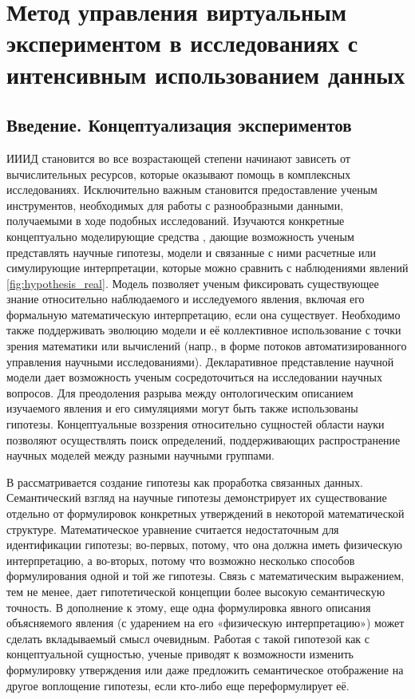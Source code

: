 \chapter{Метод управления виртуальным экспериментом в исследованиях с интенсивным использованием данных} \label{chapt2}
\newtheorem{mydef}{Definition}

\section{Введение. Концептуализация экспериментов}\label{sect1_2_6}

ИИИД становится во все возрастающей степени начинают зависеть от вычислительных ресурсов, которые оказывают помощь в 
комплексных исследованиях. Исключительно важным становится предоставление ученым инструментов, необходимых для работы 
с разнообразными данными, получаемыми в ходе подобных исследований. Изучаются конкретные концептуально моделирующие 
средства \cite{porto2013}, дающие возможность ученым представлять научные гипотезы, модели и связанные с ними расчетные 
или симулирующие интерпретации, которые можно сравнить с наблюдениями явлений \cref{fig:hypothesis_real}. Модель 
позволяет ученым фиксировать существующее знание относительно наблюдаемого и исследуемого явления, включая его 
формальную математическую интерпретацию, если она существует. Необходимо также поддерживать эволюцию модели и её 
коллективное использование с точки зрения математики или вычислений (напр., в форме потоков автоматизированного 
управления научными исследованиями). Декларативное представление научной модели дает возможность ученым сосредоточиться 
на исследовании научных вопросов. Для преодоления разрыва между онтологическим описанием изучаемого явления и его 
симуляциями могут быть также использованы гипотезы. Концептуальные воззрения относительно сущностей области науки 
позволяют осуществлять поиск определений, поддерживающих распространение научных моделей между разными 
научными группами. 

В \cite{Goncalves2013} рассматривается создание гипотезы как проработка связанных данных. Семантический взгляд на 
научные гипотезы демонстрирует их существование отдельно от формулировок конкретных утверждений в некоторой 
математической структуре. Математическое уравнение считается недостаточным для идентификации гипотезы; во-первых, 
потому, что она должна иметь физическую интерпретацию, а во-вторых, потому что возможно несколько способов 
формулирования одной и той же гипотезы. Связь с математическим выражением, тем не менее, дает гипотетической 
концепции более высокую семантическую точность. В дополнение к этому, еще одна формулировка явного описания 
объясняемого явления (с ударением на его «физическую интерпретацию») может сделать вкладываемый смысл очевидным. 
Работая с такой гипотезой как с концептуальной сущностью, ученые приводят к возможности изменить формулировку 
утверждения или даже предложить семантическое отображение на другое воплощение гипотезы, если кто-либо еще 
переформулирует её.

